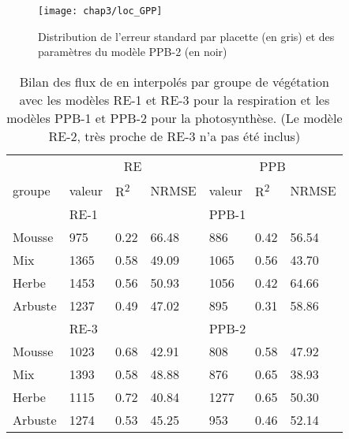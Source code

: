 \begin{figure}
\centering
\texttt{[image: chap3/loc\_GPP]}
\caption{Distribution de l'erreur standard par placette (en gris) et des paramètres du modèle PPB-2 (en noir)}
\label{fig:loc_GPP}
\end{figure}

\begin{table}
\centering
\caption{Bilan des flux de \coo en \si{\gcma} interpolés par groupe de végétation avec les modèles RE-1 et RE-3 pour la respiration et les modèles PPB-1 et PPB-2 pour la photosynthèse. (Le modèle RE-2, très proche de RE-3 n'a pas été inclus)}
\label{table:flux_grp}
\begin{tabular}{lllllll}\toprule
& \multicolumn{3}{c}{RE} &  \multicolumn{3}{c}{PPB} \\ \cmidrule(lr){2-4} \cmidrule(lr){5-7} 
groupe & valeur & R\textsuperscript{2} & NRMSE & valeur & R\textsuperscript{2} & NRMSE\\ \midrule
& \multicolumn{3}{l}{RE-1} &  \multicolumn{3}{l}{PPB-1} \\
Mousse &  \num{975} & \num{0.22} & \num{66.48} & \num{886} & \num{0.42} & \num{56.54} \\
Mix &  \num{1365} & \num{0.58} & \num{49.09} & \num{1065} & \num{0.56} & \num{43.70}  \\
Herbe &  \num{1453} & \num{0.56} & \num{50.93}  & \num{1056} & \num{0.42} & \num{64.66} \\
Arbuste &  \num{1237} & \num{0.49} & \num{47.02} & \num{895} & \num{0.31} & \num{58.86}  \\ [+1ex]
& \multicolumn{3}{l}{RE-3} &  \multicolumn{3}{l}{PPB-2} \\
Mousse &  \num{1023} & \num{0.68} & \num{42.91} & \num{808} & \num{0.58} & \num{47.92} \\
Mix &  \num{1393} & \num{0.58} & \num{48.88} & \num{876} & \num{0.65} & \num{38.93}  \\
Herbe &  \num{1115} & \num{0.72} & \num{40.84}  & \num{1277} & \num{0.65} & \num{50.30} \\
Arbuste &  \num{1274} & \num{0.53} & \num{45.25} & \num{953} & \num{0.46} & \num{52.14}  \\
\bottomrule
\end{tabular}
\end{table}

